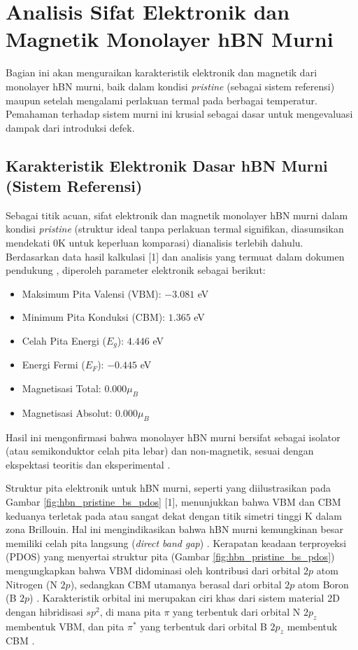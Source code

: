 \section{Analisis Sifat Elektronik dan Magnetik Monolayer hBN Murni}
\label{sec:hbn_murni}
Bagian ini akan menguraikan karakteristik elektronik dan magnetik dari monolayer hBN murni, baik dalam kondisi \textit{pristine} (sebagai sistem referensi) maupun setelah mengalami perlakuan termal pada berbagai temperatur. Pemahaman terhadap sistem murni ini krusial sebagai dasar untuk mengevaluasi dampak dari introduksi defek.

\subsection{Karakteristik Elektronik Dasar hBN Murni (Sistem Referensi)}
\label{subsec:hbn_murni_dasar}
Sebagai titik acuan, sifat elektronik dan magnetik monolayer hBN murni dalam kondisi \textit{pristine} (struktur ideal tanpa perlakuan termal signifikan, diasumsikan mendekati 0K untuk keperluan komparasi) dianalisis terlebih dahulu. Berdasarkan data hasil kalkulasi [1] dan analisis yang termuat dalam dokumen pendukung \cite{[1, 1, 1]}, diperoleh parameter elektronik sebagai berikut:
\begin{itemize}
    \item Maksimum Pita Valensi (VBM): $-3.081$ eV
    \item Minimum Pita Konduksi (CBM): $1.365$ eV
    \item Celah Pita Energi ($E_g$): $4.446$ eV
    \item Energi Fermi ($E_F$): $-0.445$ eV
    \item Magnetisasi Total: $0.000 \mu_B$
    \item Magnetisasi Absolut: $0.000 \mu_B$
\end{itemize}
Hasil ini mengonfirmasi bahwa monolayer hBN murni bersifat sebagai isolator (atau semikonduktor celah pita lebar) dan non-magnetik, sesuai dengan ekspektasi teoritis dan eksperimental \cite{[1], Watanabe2004}.

Struktur pita elektronik untuk hBN murni, seperti yang diilustrasikan pada Gambar \ref{fig:hbn_pristine_bs_pdos} [1], menunjukkan bahwa VBM dan CBM keduanya terletak pada atau sangat dekat dengan titik simetri tinggi K dalam zona Brillouin. Hal ini mengindikasikan bahwa hBN murni kemungkinan besar memiliki celah pita langsung (\textit{direct band gap}) \cite{[1]}. Kerapatan keadaan terproyeksi (PDOS) yang menyertai struktur pita (Gambar \ref{fig:hbn_pristine_bs_pdos}) mengungkapkan bahwa VBM didominasi oleh kontribusi dari orbital $2p$ atom Nitrogen (N $2p$), sedangkan CBM utamanya berasal dari orbital $2p$ atom Boron (B $2p$) \cite{[1, 1]}. Karakteristik orbital ini merupakan ciri khas dari sistem material 2D dengan hibridisasi $sp^2$, di mana pita $\pi$ yang terbentuk dari orbital N $2p_z$ membentuk VBM, dan pita $\pi^*$ yang terbentuk dari orbital B $2p_z$ membentuk CBM \cite{[1], Sachs2011}.

